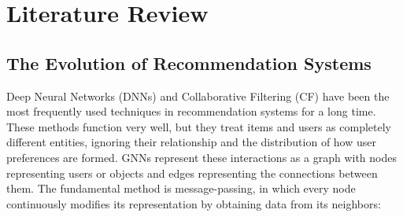 





\chapter{Literature Review}
\graphicspath{{Chapter2/}}

\section{The Evolution of Recommendation Systems}

Deep Neural Networks (DNNs) and Collaborative Filtering (CF) have been the most frequently used techniques in recommendation systems for a long time. These methods function very well, but they treat items and users as completely different entities, ignoring their relationship and the distribution of how user preferences are formed. 
GNNs represent these interactions as a graph with nodes representing users or objects and edges representing the connections between them. The fundamental method is message-passing, in which every node continuously modifies its representation by obtaining data from its neighbors:


